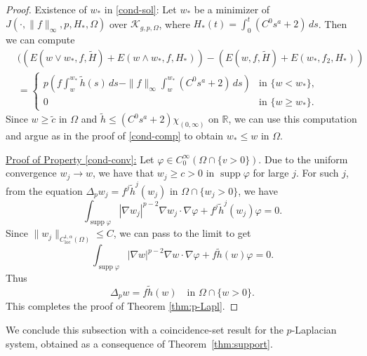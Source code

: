 \documentclass[11pt,oneside,english]{amsart}
\newcommand{\R}{{\mathbb R}}
\newcommand{\cK}{{\mathcal K}}
\newcommand{\al}{\alpha}
\newcommand{\vp}{\varphi}
\newcommand{\loc}{\operatorname{loc}}
\newcommand{\supp}{\operatorname{supp}}
\newcommand{\D}{\nabla}
\numberwithin{equation}{section}
\theoremstyle{plain}
\numberwithin{equation}{section}
\begin{document}
\begin{proof}
Existence of $w_*$ in \ref{cond-sol}: Let $w_*$ be a minimizer of $J(\cdot,\|f\|_\infty,p,H_*,\Omega)$ over $\cK_{g,p,\Omega}$, where $H_*(t)=\int_{0}^t(C^0s^a+2) \,ds$. Then we can compute
\begin{align*}
     &((E(w\vee w_*,f,\tilde H)+E(w\wedge w_*,f,H_*))-(E(w,f,\tilde H)+E(w_*,f_2,H_*))\\
    &=\begin{cases}
        p\left(f\int_{w}^{w_*}\tilde h(s)\,ds-\|f\|_\infty\int_w^{w_*}(C^0s^a+2)\,ds  \right)  &\text{in }\{w<w_*\},\\
        0&\text{in }\{w\ge w_*\}.
    \end{cases}
\end{align*}
Since $w\ge \tilde c$ in $\Omega$ and $\tilde h\le (C^0s^a+2)\chi_{(0,\infty)}$ on $\R$, we can use this computation and argue as in the proof of \ref{cond-comp} to obtain $w_*\le w$ in $\Omega$.



\medskip

\noindent 
\underline{Proof of Property \ref{cond-conv}:} Let $\vp\in C_0^\infty(\Omega\cap\{v>0\})$. Due to the uniform convergence $w_j\to w$, we have that $w_j\ge c>0$ in $\supp\vp$ for large $j$. For such $j$, from the equation $\Delta_pw_j=f^j\tilde h^j(w_j)$ in $\Omega\cap\{w_j>0\}$, we have
$$
\int_{\supp\vp}|\D w_j|^{p-2}\D w_j\cdot\D\vp+f^j\tilde h^j(w_j)\vp=0.
$$
Since $\|w_j\|_{C^{1,\al}_{\loc}(\Omega)}\le C$, we can pass to the limit to get
$$
\int_{\supp\vp}|\D w|^{p-2}\D w\cdot\D\vp+f\tilde h(w)\vp=0.
$$
Thus
$$
\Delta_pw=f\tilde h(w)\quad\text{in }\Omega\cap\{w>0\}.
$$
This completes the proof of Theorem \ref{thm:p-Lapl}.
\end{proof}

We conclude this subsection with a coincidence-set result for the
$p$-Laplacian system, obtained as a consequence of
Theorem~\ref{thm:support}.
\end{document}
